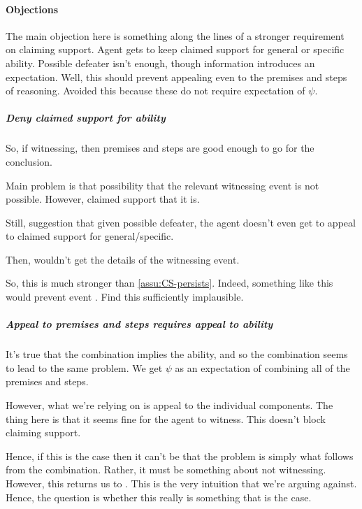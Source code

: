 \paragraph{Objections}

\begin{note}
  The main objection here is something along the lines of a stronger requirement on claiming support.
  Agent gets to keep claimed support for general or specific ability.
  Possible defeater isn't enough, though information introduces an expectation.
  Well, this should prevent appealing even to the premises and steps of reasoning.
  Avoided this because these do not require expectation of \(\psi\).
\end{note}

\subparagraph{Deny claimed support for ability}

\begin{note}
  So, if witnessing, then premises and steps are good enough to go for the conclusion.

  Main problem is that possibility that the relevant witnessing event is not possible.
  However, claimed support that it is.

  Still, suggestion that given possible defeater, the agent doesn't even get to appeal to claimed support for general/specific.

  Then, wouldn't get the details of the witnessing event.

  So, this is much stronger than \autoref{assu:CS-persists}.
  Indeed, something like this would prevent event \ESU{}.
  Find this sufficiently implausible.
\end{note}

\subparagraph{Appeal to premises and steps requires appeal to ability}

\begin{note}
  It's true that the combination implies the ability, and so the combination seems to lead to the same problem.
  We get \(\psi\) as an expectation of combining all of the premises and steps.

  However, what we're relying on is appeal to the individual components.
  The thing here is that it seems fine for the agent to witness.
  This doesn't block claiming support.

  Hence, if this is the case then it can't be that the problem is simply what follows from the combination.
  Rather, it must be something about not witnessing.
  However, this returns us to \ESU{}.
  This is the very intuition that we're arguing against.
  Hence, the question is whether this really is something that is the case.
\end{note}


